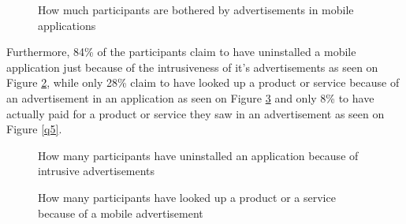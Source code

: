 \begin{figure}
\begin{center}
\caption{How much participants are bothered by advertisements in mobile applications}
\label{q2}
\end{center}
\end{figure}

Furthermore, 84\% of the participants claim to have uninstalled a mobile application just because of the intrusiveness of it's advertisements as seen on Figure \ref{q3}, while only 28\% claim to have looked up a product or service because of an advertisement in an application as seen on Figure \ref{q4} and only 8\% to have actually paid for a product or service they saw in an advertisement as seen on Figure \ref{q5}.

\begin{figure}
\begin{center}
\caption{How many participants have uninstalled an application because of intrusive advertisements}
\label{q3}
\end{center}
\end{figure}

\begin{figure}
\begin{center}
\caption{How many participants have looked up a product or a service because of a mobile advertisement}
\label{q4}
\end{center}
\end{figure}

